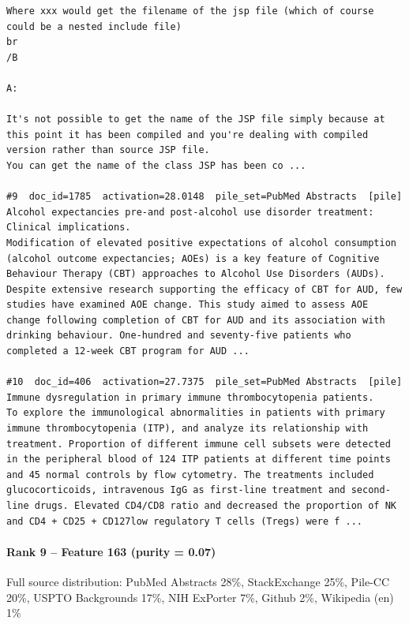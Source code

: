 \begin{verbatim}
Where xxx would get the filename of the jsp file (which of course could be a nested include file)
br
/B

A:

It's not possible to get the name of the JSP file simply because at this point it has been compiled and you're dealing with compiled version rather than source JSP file.
You can get the name of the class JSP has been co ...

#9  doc_id=1785  activation=28.0148  pile_set=PubMed Abstracts  [pile]
Alcohol expectancies pre-and post-alcohol use disorder treatment: Clinical implications.
Modification of elevated positive expectations of alcohol consumption (alcohol outcome expectancies; AOEs) is a key feature of Cognitive Behaviour Therapy (CBT) approaches to Alcohol Use Disorders (AUDs). Despite extensive research supporting the efficacy of CBT for AUD, few studies have examined AOE change. This study aimed to assess AOE change following completion of CBT for AUD and its association with drinking behaviour. One-hundred and seventy-five patients who completed a 12-week CBT program for AUD ...

#10  doc_id=406  activation=27.7375  pile_set=PubMed Abstracts  [pile]
Immune dysregulation in primary immune thrombocytopenia patients.
To explore the immunological abnormalities in patients with primary immune thrombocytopenia (ITP), and analyze its relationship with treatment. Proportion of different immune cell subsets were detected in the peripheral blood of 124 ITP patients at different time points and 45 normal controls by flow cytometry. The treatments included glucocorticoids, intravenous IgG as first-line treatment and second-line drugs. Elevated CD4/CD8 ratio and decreased the proportion of NK and CD4 + CD25 + CD127low regulatory T cells (Tregs) were f ...

\end{verbatim}

\paragraph*{Rank 9 -- Feature 163 (purity = 0.07)}

Full source distribution: PubMed Abstracts 28\%, StackExchange 25\%, Pile-CC 20\%, USPTO Backgrounds 17\%, NIH ExPorter 7\%, Github 2\%, Wikipedia (en) 1\%

